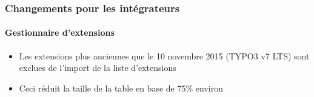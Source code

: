 
\begin{frame}[fragile]
	\frametitle{Changements pour les intégrateurs}
	\framesubtitle{Gestionnaire d'extensions}

	\begin{itemize}
		\item Les extensions plus anciennes que le 10 novembre 2015 (TYPO3 v7 LTS)
			sont exclues de l'import de la liste d'extensions
		\item Ceci réduit la taille de la table en base de 75\% environ
	\end{itemize}

\end{frame}


